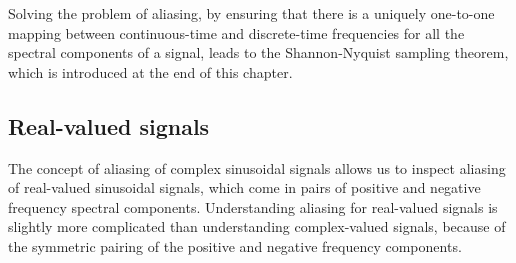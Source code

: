 Solving the problem of aliasing, by ensuring that there is a uniquely one-to-one mapping 
between continuous-time and discrete-time frequencies for all the spectral components 
of a signal, leads to the Shannon-Nyquist sampling theorem, which is introduced at the end of this chapter.

\subsection{Real-valued signals}
The concept of aliasing of complex sinusoidal signals allows us to inspect aliasing of 
real-valued sinusoidal signals, which come in pairs of positive and negative frequency 
spectral components. Understanding aliasing for real-valued signals is slightly more 
complicated than understanding complex-valued signals, because of the symmetric 
pairing of the positive and negative frequency components.

